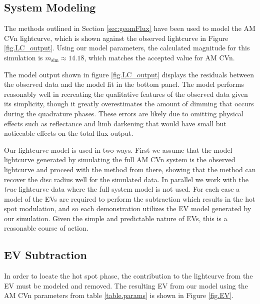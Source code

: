 \documentclass[preprint2]{aastex}
\newcommand{\note}[1]{[$\blacktriangleright$~\textbf{#1}~$\blacktriangleleft$]}
\begin{document}
\subsection{System Modeling}
The methods outlined in Section \ref{sec:geomFlux} have been used to model the
AM CVn lightcurve, which is shown against the observed lightcurve in
Figure \ref{fig.LC_output}.  Using our model parameters, the
calculated magnitude for this simulation is $m_{\text{sim}} \approx
14.18$, which matches the accepted value for AM CVn.  

The model output shown in figure \ref{fig.LC_output} displays the residuals between the observed data and the model fit in the bottom panel. The model performs reasonably well in recreating the qualitative features of the observed data given its simplicity, though it greatly overestimates the amount of dimming that occurs during the quadrature phases. These errors are likely due to omitting physical effects such as reflectance and limb darkening that would have small but noticeable effects on the total flux output. 

Our lightcurve model is used in two ways. First we assume that the model lightcurve generated by simulating the full AM CVn system is the observed lightcurve and proceed with the method from there, showing that the method can recover the disc radius well for the simulated data. In parallel we work with the \textit{true} lightcurve data where the full system model is not used. For each case a model of the EVs are required to perform the subtraction which results in the hot spot modulation, and so each demonstration utilizes the EV model generated by our simulation. Given the simple and predictable nature of EVs, this is a reasonable course of action.



\subsection{EV Subtraction}

In order to locate the hot spot phase, the contribution to the 
lightcurve from the EV must be modeled and removed. The 
resulting EV from our model using the AM CVn parameters from table \ref{table.params} is shown in Figure \ref{fig.EV}.
\end{document}

